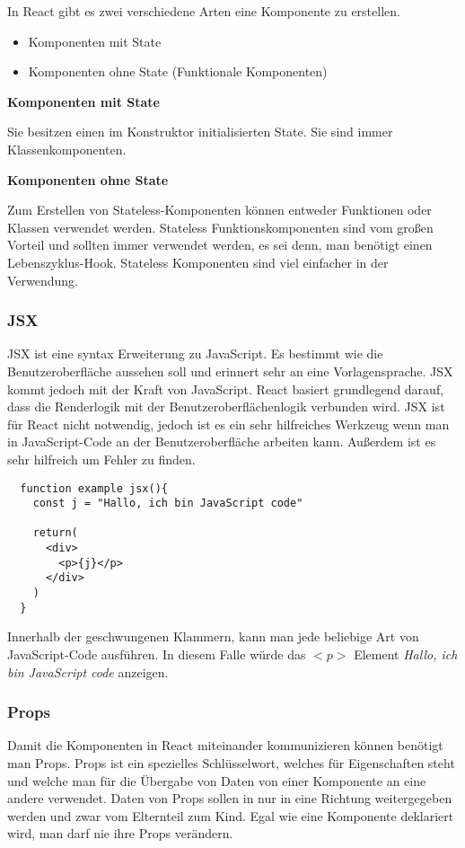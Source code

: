 In React gibt es zwei verschiedene Arten eine Komponente zu erstellen.
\begin{itemize}
  \item Komponenten mit State
  \item Komponenten ohne State (Funktionale Komponenten)\\
\end{itemize}

\centerline{\textbf{Komponenten mit State}}
Sie besitzen einen im Konstruktor initialisierten State. Sie sind immer Klassenkomponenten.\\

\centerline{\textbf{Komponenten ohne State}}
Zum Erstellen von Stateless-Komponenten können entweder Funktionen oder Klassen verwendet werden.
Stateless Funktionskomponenten sind vom großen Vorteil und sollten immer verwendet werden, es sei 
denn, man benötigt einen Lebenszyklus-Hook. Stateless Komponenten sind viel einfacher in der
Verwendung.\cite{KompState} 

\subsubsection{JSX}
JSX ist eine syntax Erweiterung zu JavaScript. Es bestimmt wie die Benutzeroberfläche aussehen soll
und erinnert sehr an eine Vorlagensprache. JSX kommt jedoch mit der Kraft von JavaScript. React basiert 
grundlegend darauf, dass die Renderlogik mit der Benutzeroberflächenlogik verbunden wird. JSX ist 
für React nicht notwendig, jedoch ist es ein sehr hilfreiches Werkzeug wenn man in JavaScript-Code an 
der Benutzeroberfläche arbeiten kann. Außerdem ist es sehr hilfreich um Fehler zu finden.
\begin{lstlisting}
  function example jsx(){
    const j = "Hallo, ich bin JavaScript code"

    return(
      <div>
        <p>{j}</p>
      </div>
    )
  }
\end{lstlisting}
Innerhalb der geschwungenen Klammern, kann man jede beliebige Art von JavaScript-Code ausführen.
In diesem Falle würde das $<p>$ Element \textit{Hallo, ich bin JavaScript code} anzeigen.
~\cite{JSX}

\subsubsection{Props}

 Damit die Komponenten in React miteinander kommunizieren können benötigt man Props. Props ist ein
 spezielles Schlüsselwort, welches für Eigenschaften steht und welche man für die Übergabe von 
 Daten von einer Komponente an eine andere verwendet. Daten von Props sollen in nur in eine 
 Richtung weitergegeben werden und zwar vom Elternteil zum Kind. Egal wie eine Komponente 
 deklariert wird, man darf nie ihre Props verändern.\\


